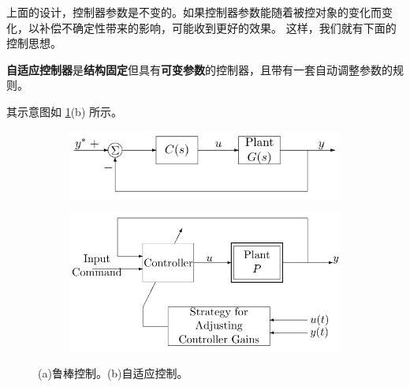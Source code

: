 上面的设计，控制器参数是不变的。如果控制器参数能随着被控对象的变化而变化，以补偿不确定性带来的影响，可能收到更好的效果。
这样，我们就有下面的控制思想。
\begin{definition}[自适应控制器]
    \textbf{自适应控制器}是\textbf{结构固定}但具有\textbf{可变参数}的控制器，且带有一套自动调整参数的规则。
  \end{definition}
  其示意图如 \ref{adaptive_robust}(b) 所示。
\begin{figure}[htbp]
  \centering
  \begin{subfigure}{0.4\textwidth}
    \includegraphics[width=1\linewidth]{figure/adaptive/robust.png} %
    \caption{}
\end{subfigure}
  \begin{subfigure}{0.4\textwidth}
    \includegraphics[width=1\linewidth]{figure/adaptive/adaptive_controller.png} %
    \caption{}
\end{subfigure}
\caption{(a)鲁棒控制。(b)自适应控制。}
\label{adaptive_robust}
\end{figure}
    
